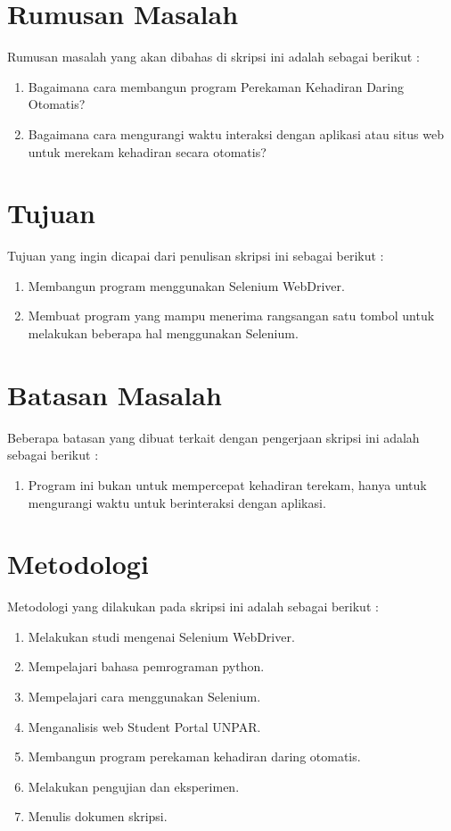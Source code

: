 \section{Rumusan Masalah}
\label{sec:rumusan}
Rumusan masalah yang akan dibahas di skripsi ini adalah sebagai berikut :
\begin{enumerate}
	\item Bagaimana cara membangun program Perekaman Kehadiran Daring Otomatis?
	\item Bagaimana cara mengurangi waktu interaksi dengan aplikasi atau situs web untuk merekam kehadiran secara otomatis?
\end{enumerate}

\section{Tujuan}
\label{sec:tujuan}
Tujuan yang ingin dicapai dari penulisan skripsi ini sebagai berikut :
\begin{enumerate}
	\item Membangun program menggunakan Selenium WebDriver.
	\item Membuat program yang mampu menerima rangsangan satu tombol untuk melakukan beberapa hal menggunakan Selenium.
\end{enumerate}

\section{Batasan Masalah}
\label{sec:batasan}
Beberapa batasan yang dibuat terkait dengan pengerjaan skripsi ini adalah sebagai berikut :
\begin{enumerate}
	\item Program ini bukan untuk mempercepat kehadiran terekam, hanya untuk mengurangi waktu untuk berinteraksi dengan aplikasi.
\end{enumerate}


\section{Metodologi}
\label{sec:metlit}
Metodologi yang dilakukan pada skripsi ini adalah sebagai berikut :
\begin{enumerate}
	\item Melakukan studi mengenai Selenium WebDriver.
	\item Mempelajari bahasa pemrograman python.
	\item Mempelajari cara menggunakan Selenium.
	\item Menganalisis web Student Portal UNPAR.
	\item Membangun program perekaman kehadiran daring otomatis.
	\item Melakukan pengujian dan eksperimen.
	\item Menulis dokumen skripsi.		
\end{enumerate}


